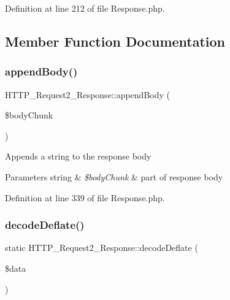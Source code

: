 Definition at line 212 of file Response.\+php.



\subsection{Member Function Documentation}
\mbox{\label{classHTTP__Request2__Response_a9c058efa93fa093f9e2ea3899aaafd81}} 
\subsubsection{\texorpdfstring{append\+Body()}{appendBody()}}
{\footnotesize\ttfamily H\+T\+T\+P\+\_\+\+Request2\+\_\+\+Response\+::append\+Body (\begin{DoxyParamCaption}\item[{}]{\$body\+Chunk }\end{DoxyParamCaption})}

Appends a string to the response body


\begin{DoxyParams}[1]{Parameters}
string & {\em \$body\+Chunk} & part of response body \\
\hline
\end{DoxyParams}


Definition at line 339 of file Response.\+php.

\mbox{\label{classHTTP__Request2__Response_ae43f4b1062afa9036c71e3c506d5979e}} 
\subsubsection{\texorpdfstring{decode\+Deflate()}{decodeDeflate()}}
{\footnotesize\ttfamily static H\+T\+T\+P\+\_\+\+Request2\+\_\+\+Response\+::decode\+Deflate (\begin{DoxyParamCaption}\item[{}]{\$data }\end{DoxyParamCaption})\hspace{0.3cm}{\ttfamily [static]}}

